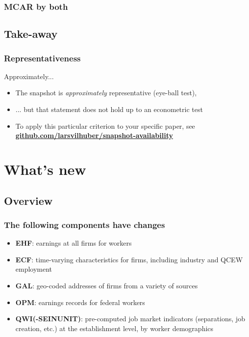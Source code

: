 \documentclass[aspectratio=169]{beamer}
\begin{document}
\begin{frame}
	\frametitle{MCAR by both}
	\small \centering
	
\end{frame}

\subsection{Take-away}
\begin{frame}
	\frametitle{Representativeness}
\begin{block}{Approximately...}
  \begin{itemize}
  	\item The snapshot is \textit{approximately} representative (eye-ball test), 
  	\item ... but that statement does not hold up to an econometric test
  	\item To apply this particular criterion to your specific paper, see \textbf{\href{https://github.com/larsvilhuber/snapshot-availability}{github.com/larsvilhuber/snapshot-availability}}
  \end{itemize}
\end{block}
\end{frame}


\section{What's new}

\subsection{Overview}
\begin{frame}
\frametitle{The following components have changes}
\begin{itemize}
	\item \textbf{\ac{EHF}}: earnings at all firms for workers
	\item \textbf{\ac{ECF}}: time-varying characteristics for firms, including industry and QCEW employment
	\item \textbf{\ac{GAL}}: geo-coded addresses of firms from a variety of sources
	\item \textbf{\ac{OPM}}: earnings records for federal workers
	\item \textbf{\ac{QWI}(-SEINUNIT)}: pre-computed job market indicators (separations, job creation, etc.) at the establishment level, by worker demographics
\end{itemize}
\end{frame}
\end{document}
